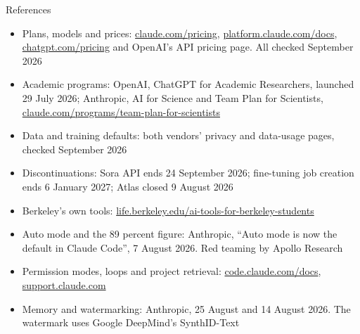 \documentclass[aspectratio=169]{beamer}
\begin{document}
\begin{frame}{References}
    \scriptsize
    \begin{itemize}\setlength{\itemsep}{2.5pt}
        \item Plans, models and prices: \url{claude.com/pricing},
              \url{platform.claude.com/docs}, \url{chatgpt.com/pricing} and OpenAI's API
              pricing page. All checked September 2026
        \item Academic programs: OpenAI, ChatGPT for Academic Researchers, launched
              29 July 2026; Anthropic, AI for Science and Team Plan for Scientists,
              \url{claude.com/programs/team-plan-for-scientists}
        \item Data and training defaults: both vendors' privacy and data-usage pages,
              checked September 2026
        \item Discontinuations: Sora API ends 24 September 2026; fine-tuning job creation
              ends 6 January 2027; Atlas closed 9 August 2026
        \item Berkeley's own tools: \url{life.berkeley.edu/ai-tools-for-berkeley-students}
        \item Auto mode and the 89 percent figure: Anthropic, ``Auto mode is now the default
              in Claude Code'', 7 August 2026. Red teaming by Apollo Research
        \item Permission modes, loops and project retrieval:
              \url{code.claude.com/docs}, \url{support.claude.com}
        \item Memory and watermarking: Anthropic, 25 August and 14 August 2026. The
              watermark uses Google DeepMind's SynthID-Text
    \end{itemize}
\end{frame}
\end{document}
